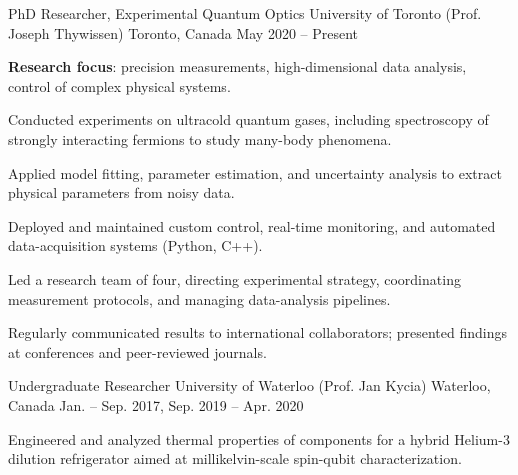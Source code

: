 

\begin{cventries}


\cventry
    {PhD Researcher, Experimental Quantum Optics} %
    {University of Toronto (Prof. Joseph Thywissen)} %
    {Toronto, Canada} %
    {May 2020 -- Present} %
        {
      \begin{cvitems} %
        \item {\textbf{Research focus}: precision measurements, high-dimensional data analysis, control of complex physical systems.}
        \item {Conducted experiments on ultracold quantum gases, including spectroscopy of strongly interacting fermions to study many-body phenomena.}
        \item {Applied model fitting, parameter estimation, and uncertainty analysis to extract physical parameters from noisy data.} 
        \item {Deployed and maintained custom control, real-time monitoring, and automated data-acquisition systems (Python, C++).} 
        \item {Led a research team of four, directing experimental strategy, coordinating measurement protocols, and managing data-analysis pipelines.}
        \item {Regularly communicated results to international collaborators; presented findings at conferences and peer-reviewed journals.}
      \end{cvitems}
    }


  \cventry
    {Undergraduate Researcher} %
    {University of Waterloo (Prof. Jan Kycia)} %
    {Waterloo, Canada} %
    {Jan. -- Sep. 2017, Sep. 2019 -- Apr. 2020} %
      {
      \begin{cvitems} %
        \item{Engineered and analyzed thermal properties of components for a hybrid Helium-3 dilution refrigerator aimed at millikelvin-scale spin-qubit characterization.}
      \end{cvitems}
    }


\end{cventries}
